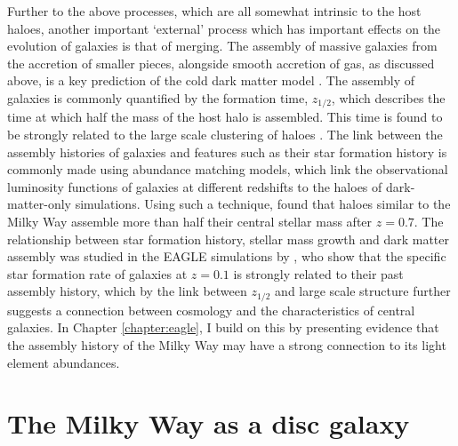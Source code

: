 Further to the above processes, which are all somewhat intrinsic to the host haloes, another important `external' process which has important effects on the evolution of galaxies is that of merging. The assembly of massive galaxies from the accretion of smaller pieces, alongside smooth accretion of gas, as discussed above, is a key prediction of the cold dark matter model \citep[e.g.][]{1974ApJ...187..425P}. The assembly of galaxies is commonly quantified by the formation time, $z_{1/2}$, which describes the time at which half the mass of the host halo is assembled. This time is found to be strongly related to the large scale clustering of haloes \citep[commonly referred to as assembly bias, e.g.][]{2005MNRAS.363L..66G,2007MNRAS.377L...5G}. The link between the assembly histories of galaxies and features such as their star formation history is commonly made using abundance matching models, which link the observational luminosity functions of galaxies at different redshifts to the haloes of dark-matter-only simulations. Using such a technique, \citet{2013MNRAS.428.3121M} found that haloes similar to the Milky Way assemble more than half their central stellar mass after $z=0.7$. The relationship between star formation history, stellar mass growth and dark matter assembly was studied in the EAGLE simulations by \citep{2018arXiv180505956M}, who show that the specific star formation rate of galaxies at $z=0.1$ is strongly related to their past assembly history, which by the link between $z_{1/2}$ and large scale structure further suggests a connection between cosmology and the characteristics of central galaxies. In Chapter \ref{chapter:eagle}, I build on this by presenting evidence that the assembly history of the Milky Way may have a strong connection to its light element abundances.


\section{The Milky Way as a disc galaxy}
\label{sec:mwadg}

